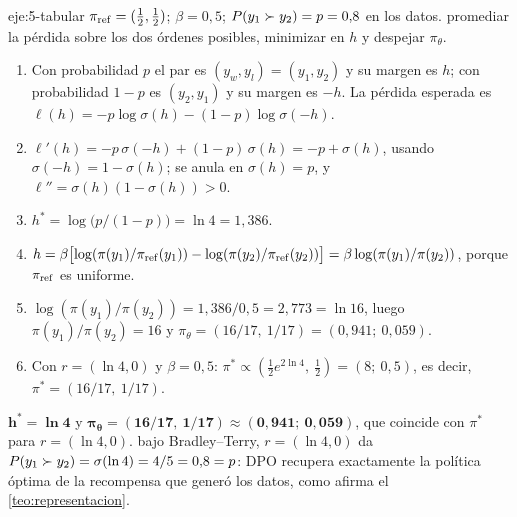 \begin{solucion}{eje:5-tabular}
\datos $\pi_{\mathrm{ref}}=(\tfrac12,\tfrac12)$; $\beta=0{,}5$; $P(y_1\succ y_2)=p=0{,}8$ en los datos.
\planteamiento promediar la pérdida sobre los dos órdenes posibles, minimizar en $h$ y despejar $\pi_\theta$.
\pasos
\begin{enumerate}[label=\arabic*.]
  \item Con probabilidad $p$ el par es $(y_w,y_l)=(y_1,y_2)$ y su margen es $h$; con probabilidad $1-p$ es $(y_2,y_1)$ y su margen es $-h$. La pérdida esperada es $\ell(h)=-p\log\sigma(h)-(1-p)\log\sigma(-h)$.
  \item $\ell'(h)=-p\,\sigma(-h)+(1-p)\,\sigma(h)=-p+\sigma(h)$, usando $\sigma(-h)=1-\sigma(h)$; se anula en $\sigma(h)=p$, y $\ell''=\sigma(h)(1-\sigma(h))>0$.
  \item $h^{*}=\log\bigl(p/(1-p)\bigr)=\ln 4=1{,}386$.
  \item $h=\beta\bigl[\log(\pi(y_1)/\pi_{\mathrm{ref}}(y_1))-\log(\pi(y_2)/\pi_{\mathrm{ref}}(y_2))\bigr]=\beta\log(\pi(y_1)/\pi(y_2))$, porque $\pi_{\mathrm{ref}}$ es uniforme.
  \item $\log(\pi(y_1)/\pi(y_2))=1{,}386/0{,}5=2{,}773=\ln 16$, luego $\pi(y_1)/\pi(y_2)=16$ y $\pi_\theta=(16/17,\ 1/17)=(0{,}941;\ 0{,}059)$.
  \item Con $r=(\ln 4,0)$ y $\beta=0{,}5$: $\pi^{*}\propto(\tfrac12e^{2\ln 4},\ \tfrac12)=(8;\ 0{,}5)$, es decir, $\pi^{*}=(16/17,\ 1/17)$.
\end{enumerate}
\resultado $\mathbf{h^{*}=\ln 4}$ y $\mathbf{\pi_\theta=(16/17,\ 1/17)\approx(0{,}941;\ 0{,}059)}$, que coincide con $\pi^{*}$ para $r=(\ln 4,0)$.
\comprobacion bajo Bradley--Terry, $r=(\ln 4,0)$ da $P(y_1\succ y_2)=\sigma(\ln 4)=4/5=0{,}8=p$: DPO recupera exactamente la política óptima de la recompensa que generó los datos, como afirma el \cref{teo:representacion}.
\end{solucion}

